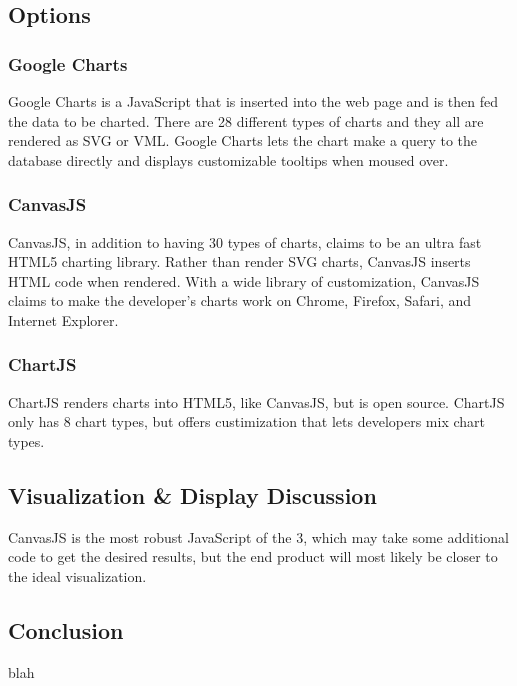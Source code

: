 \documentclass[onecolumn, draftclsnofoot,10pt, compsoc]{IEEEtran}
\begin{document}
\begin{singlespace}
\subsection{Options}
\subsubsection{Google Charts}
Google Charts is a JavaScript that is inserted into the web page and is then fed the data to be charted.
There are 28 different types of charts and they all are rendered as SVG or VML.
Google Charts lets the chart make a query to the database directly and displays customizable tooltips when moused over.
\subsubsection{CanvasJS}
CanvasJS, in addition to having 30 types of charts, claims to be an ultra fast HTML5 charting library.
Rather than render SVG charts, CanvasJS inserts HTML code when rendered.
With a wide library of customization, CanvasJS claims to make the developer's charts work on Chrome, Firefox, Safari, and Internet Explorer.
\subsubsection{ChartJS}
ChartJS renders charts into HTML5, like CanvasJS, but is open source.
ChartJS only has 8 chart types, but offers custimization that lets developers mix chart types.
\subsection{Visualization \& Display Discussion}
CanvasJS is the most robust JavaScript of the 3, which may take some additional code to get the desired results, but the end product will most likely be closer to the ideal visualization. 
\subsection{Conclusion}
blah

\nocite{*}




\end{singlespace}
\end{document}
